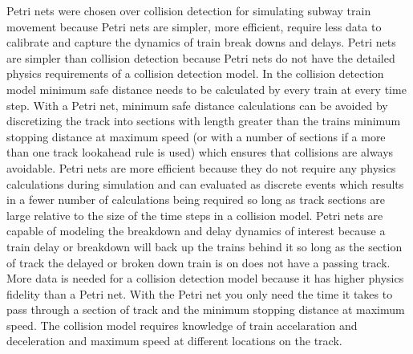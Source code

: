 Petri nets were chosen over collision detection for simulating subway train
movement because Petri nets are simpler, more efficient, require less data to
calibrate and capture the dynamics of train break downs and delays. Petri nets are simpler than collision detection because Petri nets do not have
the detailed physics requirements of a collision detection model. In the
collision detection model minimum safe distance needs to be calculated by every
train at every time step. With a Petri net, minimum safe distance calculations
can be avoided by discretizing the track into sections with length greater than
the trains minimum stopping distance at maximum speed (or with a number of
sections if a more than one track lookahead rule is used) which ensures that
collisions are always avoidable. Petri nets are more efficient because they do not require any physics calculations during simulation and can evaluated as discrete events which results in a fewer number of calculations being required so long as track sections are large relative to the size of the time steps in a collision model. Petri nets are capable of modeling the breakdown and delay dynamics of interest because a train delay or breakdown will back up the trains behind it so long as the section of track the delayed or broken down train is on does not have a
passing track. More data is needed for a collision detection model because it has higher physics fidelity than a Petri net. With the Petri net you only need the time it takes to pass through a section of track and the minimum stopping distance at
maximum speed. The collision model requires knowledge of train accelaration and
deceleration and maximum speed at different locations on the track.
